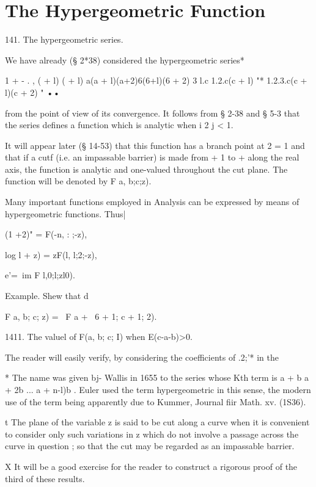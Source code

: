\chapter{The Hypergeometric Function} 

141. The hypergeometric series.

We have already (§ 2*38) considered the hypergeometric series*

1 + - . , ( + l) ( + l) a(a + l)(a+2)6(6+l)(6 + 2) 3 l.c 1.2.c(c + l)
"* 1.2.3.c(c + l)(c + 2) " ••

from the point of view of its convergence. It follows from § 2-38 and
§ 5-3 that the series defines a function which is analytic when i 2 j
< 1.

It will appear later (§ 14-53) that this function has a branch point
at 2 = 1 and that if a cutf (i.e. an impassable barrier) is made from
+ 1 to + along the real axis, the function is analytic and one-valued
throughout the cut plane. The function will be denoted by F a, b;c;z).

Many important functions employed in Analysis can be expressed by
means of hypergeometric functions. Thus|

(1 +2)" = F(-n, : ;-z),

log l + z) = zF(l, l;2;-z),

e'=\ im F l,0;l;zl0).



Example. Shew that d



F a, b; c; z) = ~F a + \, 6 + 1; c + 1; 2).



1411. The valuel of F(a, b; c; I) when E(c-a-b)>0.

The reader will easily verify, by considering the coefficients of
.2;'* in the

* The name was given bj- Wallis in 1655 to the series whose Kth term
is a + b a + 2b ... a + n-l)b . Euler used the term hypergeometric in
this sense, the modern use of the term being apparently due to Kummer,
Journal fiir Math. xv. (1S36).

t The plane of the variable z is said to be cut along a curve when it
is convenient to consider only such variations in z which do not
involve a passage across the curve in question ; so that the cut may
be regarded as an impassable barrier.

X It will be a good exercise for the reader to construct a rigorous
proof of the third of these results.

